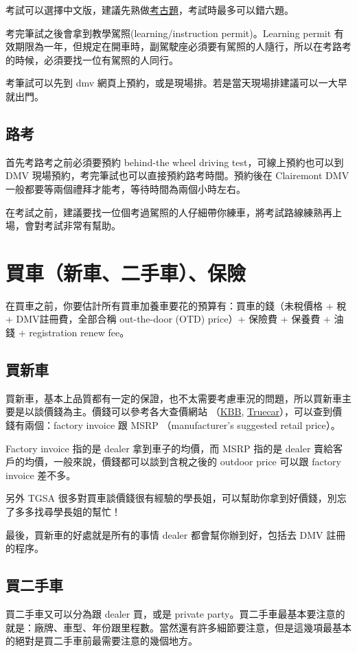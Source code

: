 \documentclass[10pt,a4paper]{book}
\begin{document}
\begin{CJK}{UTF8}{bkai}
考試可以選擇中文版，建議先熟做\href{http://www.ccyp.com/TRAFFIC/}{考古題}，考試時最多可以錯六題。

考完筆試之後會拿到教學駕照(learning/instruction permit)。Learning permit 有效期限為一年，但規定在開車時，副駕駛座必須要有駕照的人隨行，所以在考路考的時候，必須要找一位有駕照的人同行。

考筆試可以先到 dmv 網頁上預約，或是現場排。若是當天現場排建議可以一大早就出門。

\subsection{路考}
首先考路考之前必須要預約 behind-the wheel driving test，可線上預約也可以到 DMV 現場預約，考完筆試也可以直接預約路考時間。預約後在 Clairemont DMV 一般都要等兩個禮拜才能考，等待時間為兩個小時左右。

在考試之前，建議要找一位個考過駕照的人仔細帶你練車，將考試路線練熟再上場，會對考試非常有幫助。

\section{買車（新車、二手車）、保險}
在買車之前，你要估計所有買車加養車要花的預算有：買車的錢（未稅價格 + 稅 + DMV註冊費，全部合稱 out-the-door (OTD) price）+ 保險費 + 保養費 + 油錢 + registration renew fee。

\subsection{買新車}
買新車，基本上品質都有一定的保證，也不太需要考慮車況的問題，所以買新車主要是以談價錢為主。價錢可以參考各大查價網站 （\href{http://www.kbb.com}{KBB}, \href{www.truecar.com}{Truecar}），可以查到價錢有兩個：factory invoice 跟 MSRP （manufacturer's suggested retail price）。

Factory invoice 指的是 dealer 拿到車子的均價，而 MSRP 指的是 dealer 賣給客戶的均價，一般來說，價錢都可以談到含稅之後的 outdoor price 可以跟 factory invoice 差不多。

另外 TGSA 很多對買車談價錢很有經驗的學長姐，可以幫助你拿到好價錢，別忘了多多找尋學長姐的幫忙！

最後，買新車的好處就是所有的事情 dealer 都會幫你辦到好，包括去 DMV 註冊的程序。

\subsection{買二手車}
買二手車又可以分為跟 dealer 買，或是 private party。買二手車最基本要注意的就是：廠牌、車型、年份跟里程數。當然還有許多細節要注意，但是這幾項最基本的絕對是買二手車前最需要注意的幾個地方。


\end{CJK}
\end{document}

